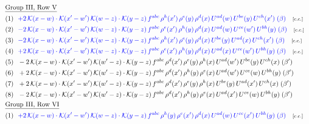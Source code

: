 \documentclass[9pt]{article}
\begin{document}
\begin{align}
&\quad\underline{\text{Group III, Row V}}\notag\\
&\quad\text{(1)}\ \ \textcolor{blue}{+2\,\mathcal{K}(x-w)\cdot\mathcal{K}(x'-w')\,\mathcal{K}(w-z)\cdot\mathcal{K}(y-z)\, f^{abc}\,\rho^{h}(x')\,\rho^{e}(y)\,\rho^{d}(x)\,U^{ad}(w)\,U^{be}(y)\,U^{ch}(x')\;(\beta)}\quad\text{\scriptsize[c.c.]}\notag\\
&\quad\text{(2)}\ \ \textcolor{blue}{-2\,\mathcal{K}(x-w)\cdot\mathcal{K}(x'-w')\,\mathcal{K}(w-z)\cdot\mathcal{K}(y-z)\, f^{abc}\,\rho^{e}(x')\,\rho^{h}(y)\,\rho^{d}(x)\,U^{ad}(w)\,U^{ce}(w')\,U^{bh}(y)\;(\beta)}\quad\text{\scriptsize[c.c.]}\notag\\
&\quad\text{(3)}\ \ \textcolor{blue}{-2\,\mathcal{K}(x-w)\cdot\mathcal{K}(x'-w')\,\mathcal{K}(w-z)\cdot\mathcal{K}(y-z)\, f^{abc}\,\rho^{h}(x')\,\rho^{e}(y)\,\rho^{d}(x)\,U^{be}(y)\,U^{ad}(x)\,U^{ch}(x')\;(\beta)}\quad\text{\scriptsize[c.c.]}\notag\\
&\quad\text{(4)}\ \ \textcolor{blue}{+2\,\mathcal{K}(x-w)\cdot\mathcal{K}(x'-w')\,\mathcal{K}(w-z)\cdot\mathcal{K}(y-z)\, f^{abc}\,\rho^{e}(x')\,\rho^{h}(y)\,\rho^{d}(x)\,U^{ad}(x)\,U^{ce}(w')\,U^{bh}(y)\;(\beta)}\quad\text{\scriptsize[c.c.]}\notag\\
&\quad\text{(5)}\ \ -2\, \mathcal{K}(x-w) \cdot \mathcal{K}(x'-w')\, \mathcal{K}(w'-z) \cdot \mathcal{K}(y-z)\, f^{abc}\, \rho^{d}(x')\,\rho^{e}(y)\, \rho^{h}(x)\,U^{ad}(w')\,U^{be}(y)\,U^{ch}(x)\;(\beta')\notag\\
&\quad\text{(6)}\ \ + 2\, \mathcal{K}(x-w) \cdot \mathcal{K}(x'-w')\, \mathcal{K}(w'-z) \cdot \mathcal{K}(y-z)\, f^{abc}\, \rho^{d}(x')\,\rho^{h}(y)\, \rho^{e}(x)\,U^{ad}(w')\,U^{ce}(w)\,U^{bh}(y)\;(\beta')\notag\\
&\quad\text{(7)}\ \ +2\, \mathcal{K}(x-w) \cdot \mathcal{K}(x'-w')\, \mathcal{K}(w'-z) \cdot \mathcal{K}(y-z)\, f^{abc}\, \rho^{d}(x')\,\rho^{e}(y)\, \rho^{h}(x)\,U^{be}(y)\,U^{ad}(x')\,U^{ch}(x)\;(\beta')\notag\\
&\quad\text{(8)}\ \ -2\, \mathcal{K}(x-w) \cdot \mathcal{K}(x'-w')\, \mathcal{K}(w'-z) \cdot \mathcal{K}(y-z)\, f^{abc}\, \rho^{d}(x')\,\rho^{h}(y)\, \rho^{e}(x)\,U^{ad}(x')\,U^{ce}(w)\,U^{bh}(y)\;(\beta')\notag\\
&\quad\underline{\text{Group III, Row VI}}\notag\\
&\quad\text{(1)}\ \ \textcolor{blue}{+2\,\mathcal{K}(x-w)\cdot\mathcal{K}(x'-w')\,\mathcal{K}(w-z)\cdot\mathcal{K}(y-z)\, f^{abc}\,\rho^{h}(y)\,\rho^{e}(x')\,\rho^{d}(x)\,U^{ad}(w)\,U^{ce}(x')\,U^{bh}(y)\;(\beta)}\quad\text{\scriptsize[c.c.]}\notag\\

\end{align}
\end{document}
